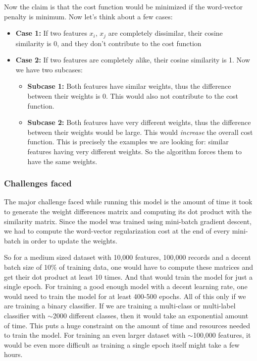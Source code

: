 Now the claim is that the cost function would be minimized if the word-vector penalty is minimum. Now let's think about a few cases: 

\begin{itemize}
    \item \textbf{Case 1:} If two features $x_{i}$, $x_{j}$ are completely dissimilar, their cosine similarity is 0, and they don't contribute to the cost function
    \item \textbf{Case 2:} If two features are completely alike, their cosine similarity is 1. Now we have two subcases:
    \begin{itemize}
        \item \textbf{Subcase 1:} Both features have similar weights, thus the difference between their weights is 0. This would also not contribute to the cost function.
        
        \item \textbf{Subcase 2:} Both features have very different weights, thus the difference between their weights would be large. This would \textit{increase} the overall cost function. This is precisely the examples we are looking for: similar features having very different weights. So the algorithm forces them to have the same weights.
    \end{itemize}
\end{itemize}

\subsubsection{Challenges faced}

The major challenge faced while running this model is the amount of time it took to generate the weight differences matrix and computing its dot product with the similarity matrix. Since the model was trained using mini-batch gradient descent, we had to compute the word-vector regularization cost at the end of every mini-batch in order to update the weights. 

So for a medium sized dataset with 10,000 features, 100,000 records and a decent batch size of 10\% of training data, one would have to compute these matrices and get their dot product at least 10 times. And that would train the model for just a single epoch. For training a good enough model with a decent learning rate, one would need to train the model for at least 400-500 epochs. All of this only if we are training a binary classifier. If we are training a multi-class or multi-label classifier with $\sim$2000 different classes, then it would take an exponential amount of time. This puts a huge constraint on the amount of time and resources needed to train the model. For training an even larger dataset with $\sim$100,000 features, it would be even more difficult as training a single epoch itself might take a few hours.

